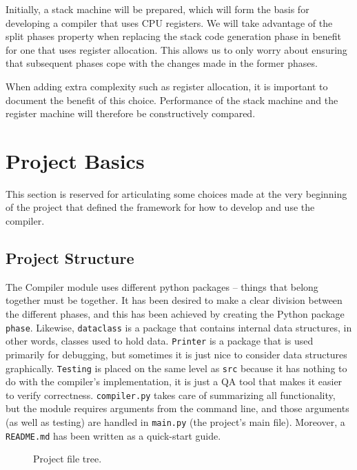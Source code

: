 Initially, a stack machine will be prepared, which will form the basis for developing a compiler that uses CPU registers. We will take advantage of the split phases property when replacing the stack code generation phase in benefit for one that uses register allocation. This allows us to only worry about ensuring that subsequent phases cope with the changes made in the former phases.

When adding extra complexity such as register allocation, it is important to document the benefit of this choice. Performance of the stack machine and the register machine will therefore be constructively compared.

\chapter{Project Basics}
This section is reserved for articulating some choices made at the very beginning of the project that defined the framework for how to develop and use the compiler.

\section{Project Structure}
The Compiler module uses different python packages -- things that belong together must be together. It has been desired to make a clear division between the different phases, and this has been achieved by creating the Python package \texttt{phase}. Likewise, \texttt{dataclass} is a package that contains internal data structures, in other words, classes used to hold data. \texttt{Printer} is a package that is used primarily for debugging, but sometimes it is just nice to consider data structures graphically. \texttt{Testing} is placed on the same level as \texttt{src} because it has nothing to do with the compiler's implementation, it is just a QA tool that makes it easier to verify correctness. \texttt{compiler.py} takes care of summarizing all functionality, but the module requires arguments from the command line, and those arguments (as well as testing) are handled in \texttt{main.py} (the project's main file). Moreover, a \texttt{README.md} has been written as a quick-start guide.

\begin{figure}[H]
    \centering
    \begin{subfigure}{0.3\textwidth}
    \centering
    
    \end{subfigure}        
    \hfill
    \begin{subfigure}{0.3\textwidth}
    \centering
    
    \end{subfigure}
    \hfill
    \begin{subfigure}{0.3\textwidth}
    \centering
    
    \end{subfigure}
    \caption{Project file tree.}
\end{figure}

